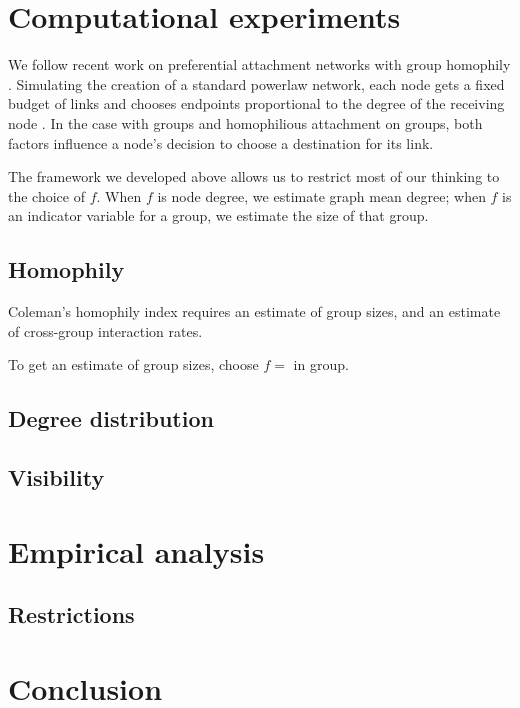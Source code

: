 \documentclass[a4paper]{article}
\begin{document}
\section{Computational experiments}

We follow recent work on preferential attachment networks with group homophily \cite{}. Simulating the creation of a standard powerlaw network, each node gets a fixed budget of links and chooses endpoints proportional to the degree of the receiving node \cite{}. In the case with groups and homophilious attachment on groups, both factors influence a node's decision to choose a destination for its link.

The framework we developed above allows us to restrict most of our thinking to the choice of $f$. When $f$ is node degree, we estimate graph mean degree; when $f$ is an indicator variable for a group, we estimate the size of that group.

\subsection{Homophily}

Coleman's homophily index requires an estimate of group sizes, and an estimate of cross-group interaction rates.

To get an estimate of group sizes, choose $f = $ in group.

\subsection{Degree distribution}


\subsection{Visibility}



\section{Empirical analysis}

\subsection{Restrictions}

\section{Conclusion}
\end{document}
